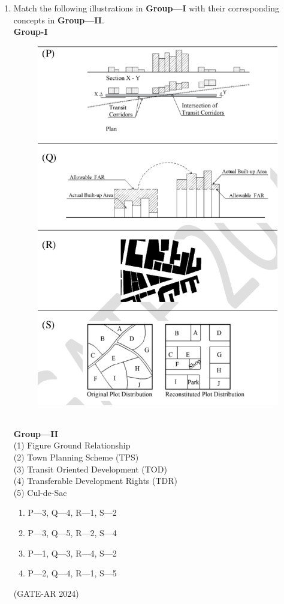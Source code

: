\documentclass[a4paper,10pt]{article}
\begin{document}
\begin{enumerate}
    \item Match the following illustrations in \textbf{Group—I} with their corresponding concepts in \textbf{Group—II}. \\
    \textbf{Group-I} \\
    \begin{figure}[h!]
    \centering
    \includegraphics[width=0.5\columnwidth]{figs/19.jpg}
    \caption{}
    \label{fig:Img19}
    \end{figure} \\
    \textbf{Group—II} \\
    (1) Figure Ground Relationship \\
    (2) Town Planning Scheme (TPS) \\
    (3) Transit Oriented Development (TOD) \\
    (4) Transferable Development Rights (TDR) \\
    (5) Cul-de-Sac
    \begin{multicols}{2}
    \begin{enumerate}
        \item P—3, Q—4, R—1, S—2
        \item P—3, Q—5, R—2, S—4
        \item P—1, Q—3, R—4, S—2
        \item P—2, Q—4, R—1, S—5
    \end{enumerate}
    \end{multicols}
    \hfill (GATE-AR 2024)


\end{enumerate}
\end{document}
